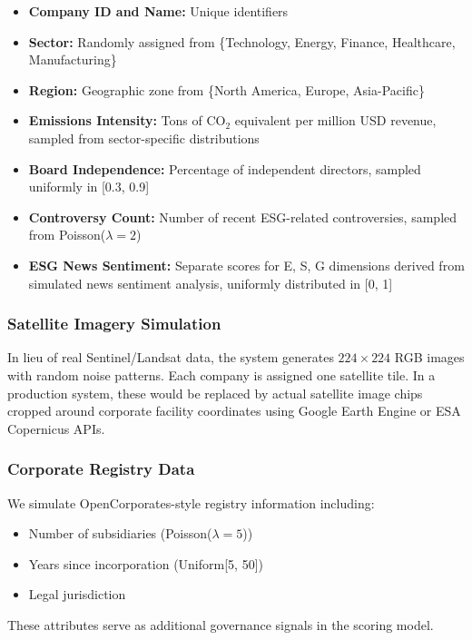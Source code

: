 \begin{itemize}
\item \textbf{Company ID and Name:} Unique identifiers
\item \textbf{Sector:} Randomly assigned from \{Technology, Energy, Finance, Healthcare, Manufacturing\}
\item \textbf{Region:} Geographic zone from \{North America, Europe, Asia-Pacific\}
\item \textbf{Emissions Intensity:} Tons of CO$_2$ equivalent per million USD revenue, sampled from sector-specific distributions
\item \textbf{Board Independence:} Percentage of independent directors, sampled uniformly in [0.3, 0.9]
\item \textbf{Controversy Count:} Number of recent ESG-related controversies, sampled from Poisson($\lambda = 2$)
\item \textbf{ESG News Sentiment:} Separate scores for E, S, G dimensions derived from simulated news sentiment analysis, uniformly distributed in [0, 1]
\end{itemize}

\subsubsection{Satellite Imagery Simulation}

In lieu of real Sentinel/Landsat data, the system generates $224 \times 224$ RGB images with random noise patterns. Each company is assigned one satellite tile. In a production system, these would be replaced by actual satellite image chips cropped around corporate facility coordinates using Google Earth Engine or ESA Copernicus APIs.

\subsubsection{Corporate Registry Data}

We simulate OpenCorporates-style registry information including:
\begin{itemize}
\item Number of subsidiaries (Poisson($\lambda = 5$))
\item Years since incorporation (Uniform[5, 50])
\item Legal jurisdiction
\end{itemize}

These attributes serve as additional governance signals in the scoring model.

